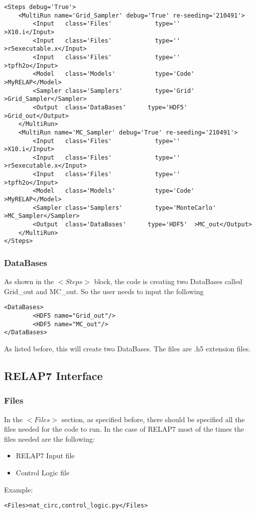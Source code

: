 \begin{lstlisting}[style=XML]
    <Steps debug='True'>
    <MultiRun name='Grid_Sampler' debug='True' re-seeding='210491'>
        <Input   class='Files'            type=''                >X10.i</Input>
        <Input   class='Files'            type=''                >r5executable.x</Input>
        <Input   class='Files'            type=''                >tpfh2o</Input>
        <Model   class='Models'           type='Code'            >MyRELAP</Model>
        <Sampler class='Samplers'         type='Grid'             >Grid_Sampler</Sampler>
        <Output  class='DataBases'      type='HDF5'  >Grid_out</Output>
    </MultiRun>
	<MultiRun name='MC_Sampler' debug='True' re-seeding='210491'>
        <Input   class='Files'            type=''                >X10.i</Input>
        <Input   class='Files'            type=''                >r5executable.x</Input>
        <Input   class='Files'            type=''                >tpfh2o</Input>
        <Model   class='Models'           type='Code'            >MyRELAP</Model>
        <Sampler class='Samplers'         type='MonteCarlo'             >MC_Sampler</Sampler>
        <Output  class='DataBases'      type='HDF5'  >MC_out</Output>
    </MultiRun>
</Steps>
\end{lstlisting}
\subsubsection{DataBases}
As shown in the $<Steps>$ block, the code is creating two DataBases called Grid\_out and MC\_out. So the user needs to input the following
\begin{lstlisting}[style=XML]
<DataBases>
        <HDF5 name="Grid_out"/> 
        <HDF5 name="MC_out"/> 
</DataBases>
\end{lstlisting}
As listed before, this will create two DataBases. The files are .h5 extension files. 

\subsection{RELAP7 Interface}
\subsubsection{Files}
In the $<Files>$ section, as specified before, there should be specified all the files needed for the code to run. In the case of RELAP7 most of the times the files needed are the following:
\begin{itemize}
\item RELAP7 Input file
\item Control Logic file
\end{itemize}
Example:
\begin{lstlisting}[style=XML]
<Files>nat_circ,control_logic.py</Files>
\end{lstlisting}
